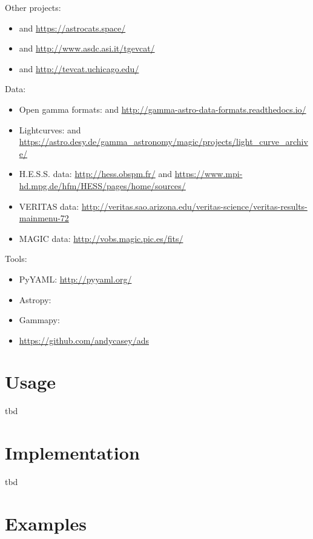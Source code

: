 \documentclass[11pt,twoside]{article}
\begin{document}
Other projects:

\begin{itemize}
\item \citet{sne-cat} and \url{https://astrocats.space/}
\item \citet{tgevcat} and \url{http://www.asdc.asi.it/tgevcat/}
\item \citet{tevcat} and \url{http://tevcat.uchicago.edu/}
\end{itemize}

Data:

\begin{itemize}
\item Open gamma formats: \citet{open-gamma} and \url{http://gamma-astro-data-formats.readthedocs.io/}
\item Lightcurves: \citet{lc} and \url{https://astro.desy.de/gamma_astronomy/magic/projects/light_curve_archive/}
\item H.E.S.S. data: \url{http://hess.obspm.fr/} and \url{https://www.mpi-hd.mpg.de/hfm/HESS/pages/home/sources/}
\item VERITAS data: \url{http://veritas.sao.arizona.edu/veritas-science/veritas-results-mainmenu-72}
\item MAGIC data: \url{http://vobs.magic.pic.es/fits/}
\end{itemize}

Tools:

\begin{itemize}
\item PyYAML: \url{http://pyyaml.org/}
\item Astropy: \citet{astropy}
\item Gammapy: \citet{gammapy}
\item \url{https://github.com/andycasey/ads}
\end{itemize}

\section{Usage}

tbd

\section{Implementation}

tbd

\section{Examples}
\end{document}
